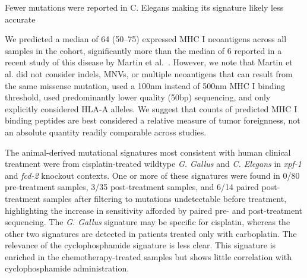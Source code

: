 Fewer mutations were reported in C. Elegans making its signature likely less accurate




We predicted a median of 64 (50--75) expressed MHC I neoantigens across all samples in the cohort, significantly more than the median of 6 reported in a recent study of this disease by Martin et al.~\cite{Martin_2016}. However, we note that Martin et al. did not consider indels, MNVs, or multiple neoantigens that can result from the same missense mutation, used a 100nm instead of 500nm MHC I binding threshold, used predominantly lower quality (50bp) sequencing, and only explicitly considered HLA-A alleles. We suggest that counts of predicted MHC I binding peptides are best considered a relative measure of tumor foreignness, not an absolute quantity readily comparable across studies.

The animal-derived mutational signatures most consistent with human clinical treatment were from cisplatin-treated wildtype \textit{G. Gallus} and \textit{C. Elegans} in \textit{xpf-1} and \textit{fcd-2} knockout contexts. One or more of these signatures were found in 0/80 pre-treatment samples, 3/35 post-treatment samples, and 6/14 paired post-treatment samples after filtering to mutations undetectable before treatment, highlighting the increase in sensitivity afforded by paired pre- and post-treatment sequencing. The \textit{G. Gallus} signature may be specific for cisplatin, whereas the other two signatures are detected in patients treated only with carboplatin. The relevance of the cyclophosphamide signature is less clear. This signature is enriched in the chemotherapy-treated samples but shows little correlation with cyclophosphamide administration.


